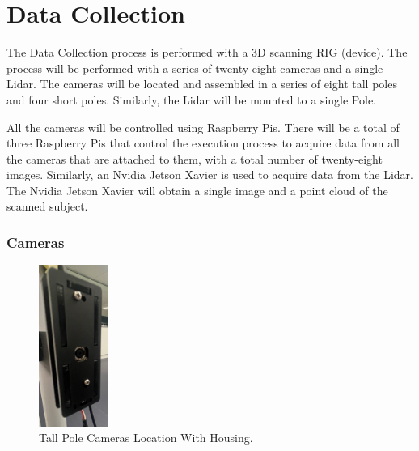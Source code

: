 \documentclass[12pt]{report}
\begin{document}
\section{Data Collection}
The Data Collection process is performed with a 3D scanning RIG (device).
The process will be performed with a series of twenty-eight cameras and a single Lidar. 
The cameras will be located and assembled in a series of eight tall poles and four short poles. Similarly, the Lidar will be mounted to a single Pole.

All the cameras will be controlled using Raspberry Pis.
There will be a total of three Raspberry Pis that control the execution process to acquire data from all the cameras that are attached to them, with a total number of twenty-eight images.
Similarly, an Nvidia Jetson Xavier is used to acquire data from the Lidar. The Nvidia Jetson Xavier will obtain a single image and a point cloud of the scanned subject. 

\newpage
\subsubsection*{Cameras}

 
\begin{figure}
  \begin{center}
    \includegraphics[width=0.2\textwidth]{IMG_5885_cropped.jpg}
  \end{center}
  \vspace{-10pt}
  \caption{Tall Pole Cameras Location With Housing.}
  \label{fig:Cameras}
\end{figure}
\end{document}
